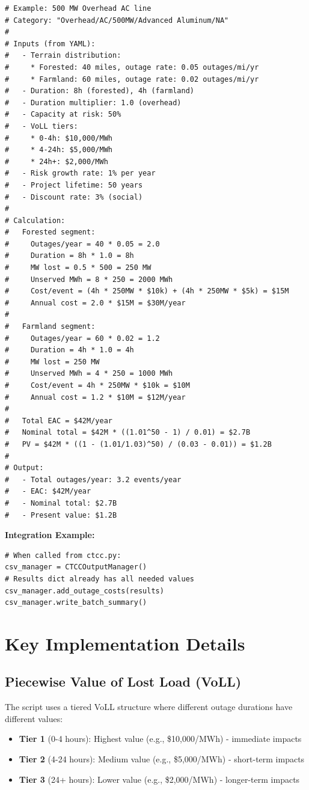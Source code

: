 \documentclass[ctcc_full_documentation.tex]{subfiles}
\begin{document}
\begin{lstlisting}
# Example: 500 MW Overhead AC line
# Category: "Overhead/AC/500MW/Advanced Aluminum/NA"
# 
# Inputs (from YAML):
#   - Terrain distribution:
#     * Forested: 40 miles, outage rate: 0.05 outages/mi/yr
#     * Farmland: 60 miles, outage rate: 0.02 outages/mi/yr
#   - Duration: 8h (forested), 4h (farmland)
#   - Duration multiplier: 1.0 (overhead)
#   - Capacity at risk: 50%
#   - VoLL tiers:
#     * 0-4h: $10,000/MWh
#     * 4-24h: $5,000/MWh
#     * 24h+: $2,000/MWh
#   - Risk growth rate: 1% per year
#   - Project lifetime: 50 years
#   - Discount rate: 3% (social)
#
# Calculation:
#   Forested segment:
#     Outages/year = 40 * 0.05 = 2.0
#     Duration = 8h * 1.0 = 8h
#     MW lost = 0.5 * 500 = 250 MW
#     Unserved MWh = 8 * 250 = 2000 MWh
#     Cost/event = (4h * 250MW * $10k) + (4h * 250MW * $5k) = $15M
#     Annual cost = 2.0 * $15M = $30M/year
#   
#   Farmland segment:
#     Outages/year = 60 * 0.02 = 1.2
#     Duration = 4h * 1.0 = 4h
#     MW lost = 250 MW
#     Unserved MWh = 4 * 250 = 1000 MWh
#     Cost/event = 4h * 250MW * $10k = $10M
#     Annual cost = 1.2 * $10M = $12M/year
#   
#   Total EAC = $42M/year
#   Nominal total = $42M * ((1.01^50 - 1) / 0.01) = $2.7B
#   PV = $42M * ((1 - (1.01/1.03)^50) / (0.03 - 0.01)) = $1.2B
#
# Output:
#   - Total outages/year: 3.2 events/year
#   - EAC: $42M/year
#   - Nominal total: $2.7B
#   - Present value: $1.2B
\end{lstlisting}

\textbf{Integration Example:}

\begin{lstlisting}
# When called from ctcc.py:
csv_manager = CTCCOutputManager()
# Results dict already has all needed values
csv_manager.add_outage_costs(results)
csv_manager.write_batch_summary()
\end{lstlisting}

\section{Key Implementation Details}

\subsection{Piecewise Value of Lost Load (VoLL)}

The script uses a tiered VoLL structure where different outage durations have different values:
\begin{itemize}
    \item \textbf{Tier 1} (0-4 hours): Highest value (e.g., \$10,000/MWh) - immediate impacts
    \item \textbf{Tier 2} (4-24 hours): Medium value (e.g., \$5,000/MWh) - short-term impacts
    \item \textbf{Tier 3} (24+ hours): Lower value (e.g., \$2,000/MWh) - longer-term impacts
\end{itemize}
\end{document}
